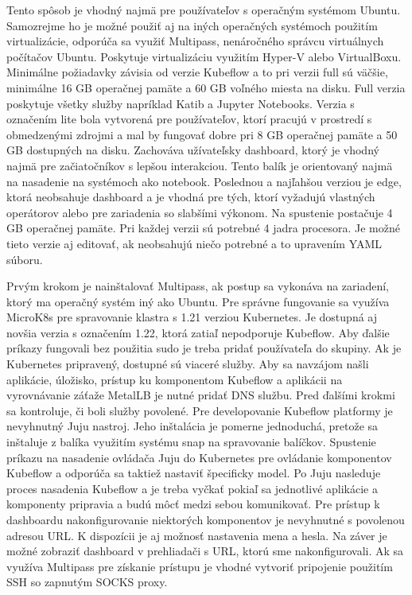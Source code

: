 Tento spôsob je vhodný najmä pre používateľov s operačným systémom Ubuntu. Samozrejme ho je možné použiť aj na iných operačných systémoch použitím virtualizácie, odporúča sa využiť Multipass, nenáročného správcu virtuálnych počítačov Ubuntu. Poskytuje virtualizáciu využitím Hyper-V alebo VirtualBoxu. Minimálne požiadavky závisia od verzie Kubeflow a to pri verzii full sú väčšie, minimálne 16 GB operačnej pamäte a 60 GB voľného miesta na disku. Full verzia poskytuje všetky služby napríklad Katib a Jupyter Notebooks. Verzia s označením lite bola vytvorená pre používateľov, ktorí pracujú v prostredí s obmedzenými zdrojmi a mal by fungovať dobre pri 8 GB operačnej pamäte a 50 GB dostupných na disku. Zachováva užívateľsky dashboard, ktorý je vhodný najmä pre začiatočníkov s lepšou interakciou. Tento balík je orientovaný najmä na nasadenie na systémoch ako notebook. Poslednou a najľahšou verziou je edge, ktorá neobsahuje dashboard a je vhodná pre tých, ktorí vyžadujú vlastných operátorov alebo pre zariadenia so slabšími výkonom. Na spustenie postačuje 4 GB operačnej pamäte. Pri každej verzii sú potrebné 4 jadra procesora. Je možné tieto verzie aj editovať, ak neobsahujú niečo potrebné a to upravením YAML súboru.

Prvým krokom je nainštalovať Multipass, ak postup sa vykonáva na zariadení, ktorý ma operačný systém iný ako Ubuntu. Pre správne fungovanie sa využíva MicroK8s pre spravovanie klastra s 1.21 verziou Kubernetes. Je dostupná aj novšia verzia s označením 1.22, ktorá zatiaľ nepodporuje Kubeflow. Aby ďalšie príkazy fungovali bez použitia sudo je treba pridať používateľa do skupiny. Ak je Kubernetes pripravený, dostupné sú viaceré služby. Aby sa navzájom našli aplikácie, úložisko, prístup ku komponentom Kubeflow a aplikácii na vyrovnávanie záťaže MetalLB je nutné pridať DNS službu. Pred ďalšími krokmi sa kontroluje, či boli služby povolené. Pre developovanie Kubeflow platformy je nevyhnutný Juju nastroj. Jeho inštalácia je pomerne jednoduchá, pretože sa inštaluje z balíka využitím systému snap na spravovanie balíčkov. Spustenie príkazu na nasadenie ovládača Juju do Kubernetes pre ovládanie komponentov Kubeflow a odporúča sa taktiež nastaviť špecificky model. Po Juju nasleduje proces nasadenia Kubeflow a je treba vyčkať pokiaľ sa jednotlivé aplikácie a komponenty pripravia a budú môcť medzi sebou komunikovať. Pre prístup k dashboardu nakonfigurovanie niektorých komponentov je nevyhnutné s povolenou adresou URL. K dispozícii je aj možnosť nastavenia mena a hesla. Na záver je možné zobraziť dashboard v prehliadači s URL, ktorú sme nakonfigurovali. Ak sa využíva Multipass pre získanie prístupu je vhodné vytvoriť pripojenie použitím SSH so zapnutým SOCKS proxy.

